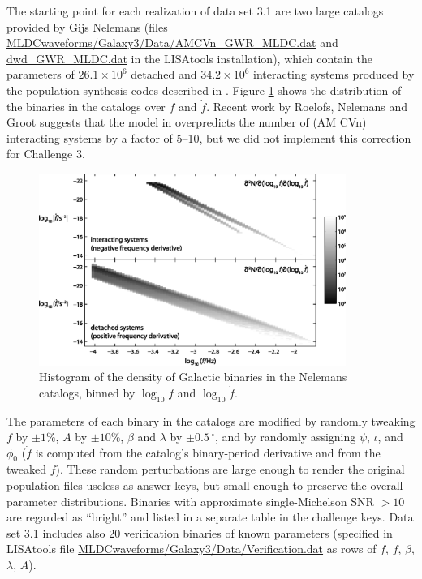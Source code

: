 \documentclass{iopart}
\begin{document}
The starting point for each realization of data set 3.1 are two large catalogs provided by Gijs Nelemans (files \url{MLDCwaveforms/Galaxy3/Data/AMCVn_GWR_MLDC.dat} and \url{dwd_GWR_MLDC.dat} in the LISAtools installation), which contain the parameters of $26.1 \times 10^6$ detached and $34.2 \times 10^6$ interacting systems produced by the population synthesis codes described in \cite{Nelemans:2001hp, Nelemans:2003ha}. Figure \ref{fig:binaries} shows the distribution of the binaries in the catalogs over $f$ and $\dot{f}$. Recent work by Roelofs, Nelemans and Groot \cite{Roelofs:2007rn} suggests that the model in \cite{Nelemans:2003ha} overpredicts the number of (AM CVn) interacting systems by a factor of 5--10, but we did not implement this correction for Challenge 3. 
%
\begin{figure}
\centerline{\includegraphics[width=10cm]{densities2b-r.eps}}
\caption{Histogram of the density of Galactic binaries in the Nelemans catalogs, binned by $\log_{10} f$ and $\log_{10} \dot{f}$.\label{fig:binaries}}
\end{figure}

The parameters of each binary in the catalogs are modified by randomly tweaking $f$ by $\pm 1\%$, $A$ by $\pm 10\%$, $\beta$ and $\lambda$ by $\pm 0.5\, {}^\circ$, and by randomly assigning $\psi$, $\iota$, and $\phi_0$ ($\dot{f}$ is computed from the catalog's binary-period derivative and from the tweaked $f$). These random perturbations are large enough to render the original population files useless as answer keys, but small enough to preserve the overall parameter distributions. Binaries with approximate single-Michelson SNR $> 10$ are regarded as ``bright'' and listed in a separate table in the challenge keys. Data set 3.1 includes also 20 verification binaries of known parameters (specified in LISAtools file \url{MLDCwaveforms/Galaxy3/Data/Verification.dat} as rows of $f$, $\dot{f}$, $\beta$, $\lambda$, $A$).
\end{document}
